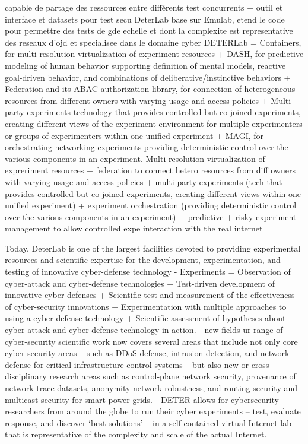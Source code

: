 capable de partage des ressources entre différents test concurrents + outil et interface et datasets pour test secu
DeterLab base sur Emulab, etend le code pour permettre des tests de gde echelle et dont la complexite est representative des reseaux d'ojd et specialisee dans le domaine cyber
DETERLab =  Containers, for multi-resolution virtualization of experiment resources + DASH, for predictive modeling of human behavior supporting definition of mental models, reactive goal-driven behavior, and combinations of deliberative/instinctive behaviors + Federation and its ABAC authorization library, for connection of heterogeneous resources from different owners with varying usage and access policies + Multi-party experiments technology that provides controlled but co-joined experiments, creating different views of the experiment environment for multiple experimenters or groups of experimenters within one unified experiment + MAGI, for orchestrating networking experiments providing deterministic control over the various components in an experiment.
Multi-resolution virtualization of expreriment resources + federation to connect hetero resources from diff owners with varying usage and access policies + multi-party experiments (tech that provides controlled but co-joined experiments, creating different views within one unified experiment) + experiment orchestration (providing deterministic control over the various components in an experiment) + predictive + risky experiment management to allow controlled expe interaction with the real internet

Today, DeterLab is one of the largest facilities devoted to providing experimental resources and scientific expertise for the development, experimentation, and testing of innovative cyber-defense technology
- Experiments =  Observation of cyber-attack and cyber-defense technologies + Test-driven development of innovative cyber-defenses + Scientific test and measurement of the effectiveness of cyber-security innovations + Experimentation with multiple approaches to using a cyber-defense technology + Scientific assessment of hypotheses about cyber-attack and cyber-defense technology in action.
- new fields     ur range of cyber-security scientific work now covers several areas that include not only core cyber-security areas – such as DDoS defense, intrusion detection, and network defense for critical infrastructure control systems – but also new or cross-disciplinary research areas such as control-plane network security, provenance of network trace datasets, anonymity network robustness, and routing security and multicast security for smart power grids.
- DETER allows for cybersecurity researchers from around the globe to run their cyber experiments – test, evaluate response, and discover ‘best solutions’ – in a self-contained virtual Internet lab that is representative of the complexity and scale of the actual Internet.

